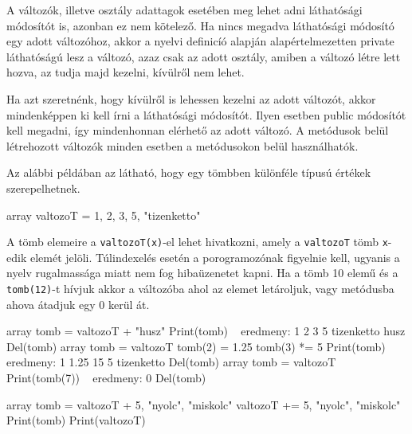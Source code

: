 
A változók, illetve osztály adattagok esetében meg lehet adni láthatósági módosítót is, azonban ez nem kötelező. Ha nincs megadva láthatósági módosító egy adott változóhoz, akkor a nyelvi definicíó alapján alapértelmezetten private láthatóságú lesz a változó, azaz csak az adott osztály, amiben a változó létre lett hozva, az tudja majd kezelni, kívülről nem lehet.

Ha azt szeretnénk, hogy kívülről is lehessen kezelni az adott változót, akkor mindenképpen ki kell írni a láthatósági módosítót. Ilyen esetben public módosítót kell megadni, így mindenhonnan elérhető az adott változó. A metódusok belül létrehozott változók minden esetben a metódusokon belül használhatók.

Az alábbi példában az látható, hogy egy tömbben különféle típusú értékek szerepelhetnek.
\begin{cpp}
array valtozoT = {1, 2, 3, 5, "tizenketto"}
\end{cpp}
A tömb elemeire a \texttt{valtozoT(x)}-el lehet hivatkozni, amely a \texttt{valtozoT} tömb \texttt{x}-edik elemét jelöli.
Túlindexelés esetén a porogramozónak figyelnie kell, ugyanis a nyelv rugalmassága miatt nem fog hibaüzenetet kapni. Ha a tömb 10 elemű és a \texttt{tomb(12)}-t hívjuk akkor a változóba ahol az elemet letároljuk, vagy metódusba ahova átadjuk egy 0 kerül át.
\begin{cpp}
array tomb = valtozoT + "husz"
Print(tomb) ~ eredmeny: 1 2 3 5 tizenketto husz
Del(tomb)
array tomb = valtozoT
tomb(2) = 1.25
tomb(3) *= 5
Print(tomb) ~ eredmeny: 1 1.25 15 5 tizenketto
Del(tomb)
array tomb = valtozoT
Print(tomb(7)) ~ eredmeny: 0
Del(tomb)

array tomb = valtozoT + {5, "nyolc", "miskolc"}
valtozoT += {5, "nyolc", "miskolc"}
Print(tomb)
Print(valtozoT)
\end{cpp}


